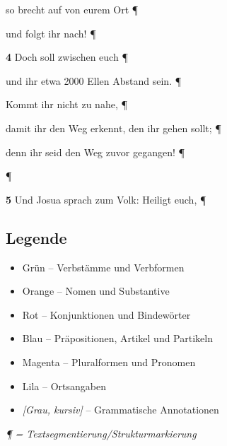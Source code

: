 \documentclass[12pt,a4paper]{article}
\newcommand{\verbstamm}[1]{\textcolor{verbcolor}{#1}}
\newcommand{\verbpart}[1]{\textcolor{prepcolor}{#1}}
\newcommand{\nomen}[1]{\textcolor{nouncolor}{#1}}
\newcommand{\konj}[1]{\textcolor{conjcolor}{#1}}
\newcommand{\prep}[1]{\textcolor{prepcolor}{#1}}
\newcommand{\partikel}[1]{\textcolor{prepcolor}{#1}}
\newcommand{\plural}[1]{\textcolor{pluralcolor}{#1}}
\newcommand{\ort}[1]{\textcolor{locationcolor}{#1}}
\newcommand{\annot}[1]{{\footnotesize\textit{[#1]}}}
\begin{document}
\hspace*{4cm} \konj{so} \verbstamm{brecht} \verbpart{auf} \prep{von} \partikel{eurem} \nomen{Ort} ¶

\hspace*{5cm} \konj{und} \nomen{folgt} \prep{ihr} \verbpart{nach}! ¶

\hspace*{3cm} \textbf{4} \konj{Doch} \konj{soll} \prep{zwischen} \partikel{euch} ¶

\hspace*{3cm} \konj{und} \prep{ihr} \partikel{etwa} \nomen{2000} \nomen{Ellen} \nomen{Abstand} \verbstamm{sein}. ¶

\hspace*{2cm} \nomen{Kommt} \prep{ihr} \konj{nicht} \prep{zu} \ort{nahe}, ¶

\hspace*{2cm} \konj{damit} \prep{ihr} \prep{den} \nomen{Weg} \verbstamm{erkennt}, \prep{den} \prep{ihr} \verbstamm{gehen} \konj{sollt}; ¶

\hspace*{3cm} \konj{denn} \prep{ihr} \verbstamm{seid} \prep{den} \nomen{Weg} \konj{zuvor} \verbstamm{gegangen}! ¶

¶

\textbf{5} \konj{Und} \nomen{Josua} \verbstamm{sprach} \prep{zum} \nomen{Volk}: \nomen{Heiligt} \partikel{euch}, ¶

\vspace{2em}

\subsection*{Legende}

\begin{itemize}
    \item \verbstamm{Grün} -- Verbstämme und Verbformen
    \item \nomen{Orange} -- Nomen und Substantive
    \item \konj{Rot} -- Konjunktionen und Bindewörter
    \item \prep{Blau} -- Präpositionen, Artikel und Partikeln
    \item \plural{Magenta} -- Pluralformen und Pronomen
    \item \ort{Lila} -- Ortsangaben
    \item \annot{Grau, kursiv} -- Grammatische Annotationen
\end{itemize}

\vspace{1em}
\textit{¶ = Textsegmentierung/Strukturmarkierung}
\end{document}
